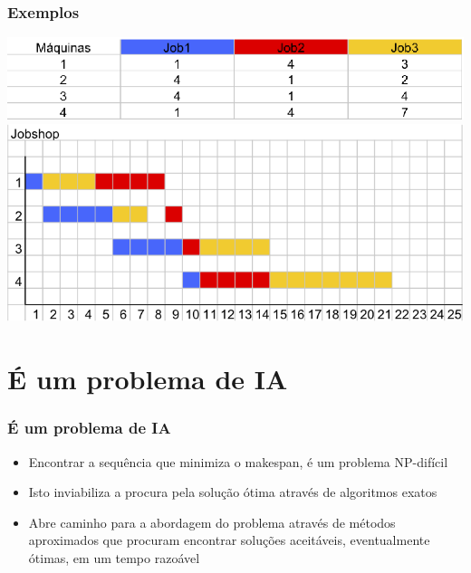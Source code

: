 \documentclass[12pt]{beamer}
\begin{document}
\begin{frame}
	\frametitle{Exemplos}
	\includegraphics[scale=.6]{tab} \\
	\includegraphics[scale=.6]{graph5} 
\end{frame}
\section{É um problema de IA}
\begin{frame}
        \frametitle{É um problema de IA}
        \begin{block}{}
                \begin{itemize}
                        \item Encontrar a sequência que minimiza o makespan, é um problema NP-difícil   \pause
                        \item Isto inviabiliza a procura pela solução ótima através de algoritmos exatos   \pause
                        \item Abre caminho para a abordagem do problema através de métodos aproximados que procuram encontrar soluções aceitáveis, eventualmente ótimas, em um tempo razoável  \pause
                \end{itemize}
        \end{block}
\end{frame}
\end{document}
